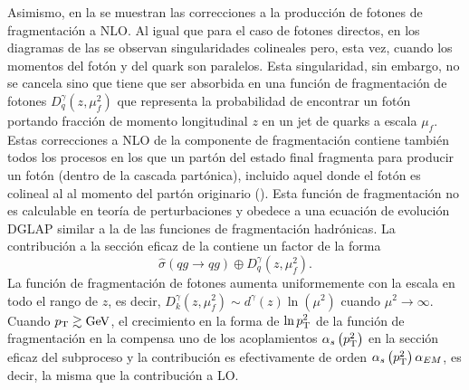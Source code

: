 Asimismo, en la \Fig{\ref{fig:theory:sm:prompt_photon:feynman_nlo_frag}} se muestran las correcciones a la producción de fotones de fragmentación a \ac{NLO}. Al igual que para el caso de fotones directos, en los diagramas de las \Figs{\ref{fig:theory:sm:prompt_photon:feynman_nlo_frag:photon_fsr}}{\ref{fig:theory:sm:prompt_photon:feynman_nlo_frag:photon_isr}} se observan singularidades colineales pero, esta vez, cuando los momentos del fotón y del quark son paralelos. Esta singularidad, sin embargo, no se cancela sino que tiene que ser absorbida en una función de fragmentación de fotones \(D_q^{\gamma} (z, \mu^2_f )\) que representa la probabilidad de encontrar un fotón portando fracción de momento longitudinal \(z\) en un jet de quarks a escala \(\mu_f\). Estas correcciones a \ac{NLO} de la componente de fragmentación contiene también todos los procesos en los que un partón del estado final fragmenta para producir un fotón (dentro de la cascada partónica), incluido aquel donde el fotón es colineal al al momento del partón originario (\Figs{\ref{fig:theory:sm:prompt_photon:feynman_nlo_frag:quark}}{\ref{fig:theory:sm:prompt_photon:feynman_nlo_frag:gluon}}). Esta función de fragmentación no es calculable en teoría de perturbaciones y obedece a una ecuación de evolución DGLAP similar a la de las funciones de fragmentación hadrónicas. La contribución a la sección eficaz de la \Fig{\ref{fig:theory:sm:prompt_photon:feynman_nlo_frag}} contiene un factor de la forma
\begin{equation}
    \label{eq:theory:sm:prompt_photon:fragmentation_contribution}
    \hat{\sigma}(qg \to qg) \oplus D_q^{\gamma} \left(z, \mu_f^2\right).
\end{equation}
La función de fragmentación de fotones aumenta uniformemente con la escala en todo el rango de \(z\), es decir, \(D_k^{\gamma} \left(z, \mu_f^2\right) \sim d^{\gamma}(z)\ln(\mu^2)\) cuando \(\mu^2 \to \infty\). Cuando \(p_{\text{T}} \gtrsim \text{GeV}\), el crecimiento en la forma de \(\ln p_{\text{T}}^2\) de la función de fragmentación en la \Eqn{\ref{eq:theory:sm:prompt_photon:fragmentation_contribution}} compensa uno de los acoplamientos \(\alpha_s \left(p_{\text{T}}^2\right)\) en la sección eficaz del subproceso y la contribución es efectivamente de orden \(\alpha_s \left(p_{\text{T}}^2\right) \alpha_{EM}\), es decir, la misma que la contribución a \ac{LO}.


